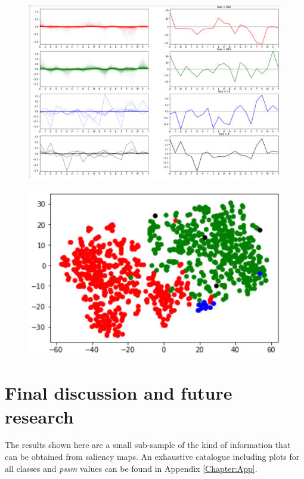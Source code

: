 \begin{figure}
	\centering
	\includegraphics[width=1\linewidth]{Figures/clusters}
	\caption{}
	\label{fig:clusters}
\end{figure}

\begin{figure}
	\centering
	\includegraphics[width=0.7\linewidth]{tsne}
	\caption{}
	\label{fig:tsne}
\end{figure}


\section{Final discussion and future research}
The results shown here are a small sub-sample of the kind of information that can be obtained from saliency maps. An exhaustive catalogue including plots for all classes and \textit{pssm} values can be found in Appendix \ref{Chapter:App}.

